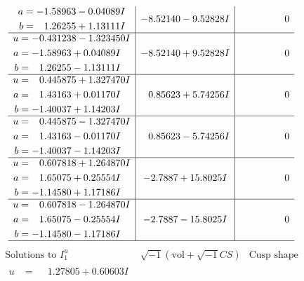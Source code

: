 \documentclass[1p]{elsarticle_modified}
\theoremstyle{definition}
\newcommand{\I}{\sqrt{-1}}
\begin{document}
$$\begin{array}{c|c|c}
\begin{aligned}
a &= -1.58963 - 0.04089 I \\
b &= \phantom{-}1.26255 + 1.13111 I\end{aligned}
 & -8.52140 - 9.52828 I & \phantom{-0.000000 } 0 \\ \hline\begin{aligned}
u &= -0.431238 - 1.323450 I \\
a &= -1.58963 + 0.04089 I \\
b &= \phantom{-}1.26255 - 1.13111 I\end{aligned}
 & -8.52140 + 9.52828 I & \phantom{-0.000000 } 0 \\ \hline\begin{aligned}
u &= \phantom{-}0.445875 + 1.327470 I \\
a &= \phantom{-}1.43163 + 0.01170 I \\
b &= -1.40037 + 1.14203 I\end{aligned}
 & \phantom{-}0.85623 + 5.74256 I & \phantom{-0.000000 } 0 \\ \hline\begin{aligned}
u &= \phantom{-}0.445875 - 1.327470 I \\
a &= \phantom{-}1.43163 - 0.01170 I \\
b &= -1.40037 - 1.14203 I\end{aligned}
 & \phantom{-}0.85623 - 5.74256 I & \phantom{-0.000000 } 0 \\ \hline\begin{aligned}
u &= \phantom{-}0.607818 + 1.264870 I \\
a &= \phantom{-}1.65075 + 0.25554 I \\
b &= -1.14580 + 1.17186 I\end{aligned}
 & -2.7887 + 15.8025 I & \phantom{-0.000000 } 0 \\ \hline\begin{aligned}
u &= \phantom{-}0.607818 - 1.264870 I \\
a &= \phantom{-}1.65075 - 0.25554 I \\
b &= -1.14580 - 1.17186 I\end{aligned}
 & -2.7887 - 15.8025 I & \phantom{-0.000000 } 0\\
 \hline 
 \end{array}$$\newpage$$\begin{array}{c|c|c}  
\text{Solutions to }I^u_{1}& \I (\text{vol} + \sqrt{-1}CS) & \text{Cusp shape}\\
 \hline 
\begin{aligned}
u &= \phantom{-}1.27805 + 0.60603 I \\

\end{aligned}
\end{array}$$
\end{document}
